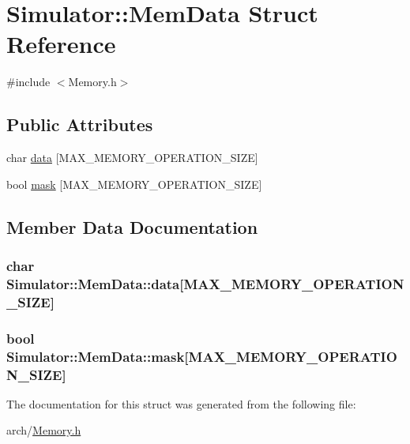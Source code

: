 \hypertarget{struct_simulator_1_1_mem_data}{\section{Simulator\+:\+:Mem\+Data Struct Reference}
\label{struct_simulator_1_1_mem_data}
}


{\ttfamily \#include $<$Memory.\+h$>$}

\subsection*{Public Attributes}
\begin{DoxyCompactItemize}
\item 
char \hyperlink{struct_simulator_1_1_mem_data_adee755e0e818d91ddf4d65e79b0027c4}{data} \mbox{[}M\+A\+X\+\_\+\+M\+E\+M\+O\+R\+Y\+\_\+\+O\+P\+E\+R\+A\+T\+I\+O\+N\+\_\+\+S\+I\+Z\+E\mbox{]}
\item 
bool \hyperlink{struct_simulator_1_1_mem_data_a0182a1612d57efa1463464b56ff40174}{mask} \mbox{[}M\+A\+X\+\_\+\+M\+E\+M\+O\+R\+Y\+\_\+\+O\+P\+E\+R\+A\+T\+I\+O\+N\+\_\+\+S\+I\+Z\+E\mbox{]}
\end{DoxyCompactItemize}


\subsection{Member Data Documentation}
\hypertarget{struct_simulator_1_1_mem_data_adee755e0e818d91ddf4d65e79b0027c4}{
\subsubsection[{data}]{\setlength{\rightskip}{0pt plus 5cm}char Simulator\+::\+Mem\+Data\+::data\mbox{[}M\+A\+X\+\_\+\+M\+E\+M\+O\+R\+Y\+\_\+\+O\+P\+E\+R\+A\+T\+I\+O\+N\+\_\+\+S\+I\+Z\+E\mbox{]}}}\label{struct_simulator_1_1_mem_data_adee755e0e818d91ddf4d65e79b0027c4}
\hypertarget{struct_simulator_1_1_mem_data_a0182a1612d57efa1463464b56ff40174}{
\subsubsection[{mask}]{\setlength{\rightskip}{0pt plus 5cm}bool Simulator\+::\+Mem\+Data\+::mask\mbox{[}M\+A\+X\+\_\+\+M\+E\+M\+O\+R\+Y\+\_\+\+O\+P\+E\+R\+A\+T\+I\+O\+N\+\_\+\+S\+I\+Z\+E\mbox{]}}}\label{struct_simulator_1_1_mem_data_a0182a1612d57efa1463464b56ff40174}


The documentation for this struct was generated from the following file\+:\begin{DoxyCompactItemize}
\item 
arch/\hyperlink{_memory_8h}{Memory.\+h}\end{DoxyCompactItemize}
